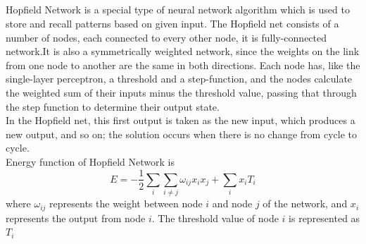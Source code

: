 \documentclass{article}
\begin{document}
   \subsection{}
    \begin{flushleft}
        \noindent
        \large{
        Hopfield Network is a special type of neural network algorithm which is used to store and recall patterns based on given input. The Hopfield net consists of a number of nodes, each connected to every other node, it is fully-connected network.It is also a symmetrically weighted network, since the weights on the link from one node to another are the same in both directions. Each node has, like the single-layer perceptron, a threshold and a step-function, and the nodes calculate the weighted sum of their inputs minus the threshold value, passing that through the step function to determine their output state.\\
        In the Hopfield net, this first output is taken as the new input, which produces a new output, and so on; the solution occurs when there is no change from cycle to cycle.\\

        Energy function of Hopfield Network is 
        \begin{equation}
E = -\frac{1}{2}\sum_{i}\sum_{i\neq j} \omega_{ij} x_i x_j + \sum_{i} x_i T_i
        \end{equation}
where $\omega_{ij}$ represents the weight between node $i$ and node $j$ of the 
network, and $x_i$ represents the output from node $i$. The threshold 
value of node $i$ is represented as $T_i$\\

}
\end{flushleft}
\end{document}
